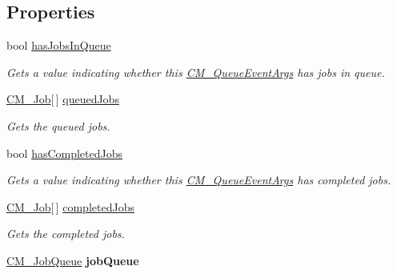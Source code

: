 \subsection*{Properties}
\begin{DoxyCompactItemize}
\item 
bool \hyperlink{class_c_m___queue_event_args_abc07a71f168a798661e040ad0f824591}{has\+Jobs\+In\+Queue}
\begin{DoxyCompactList}\small\item\em Gets a value indicating whether this \hyperlink{class_c_m___queue_event_args}{C\+M\+\_\+\+Queue\+Event\+Args} has jobs in queue. \end{DoxyCompactList}\item 
\hyperlink{class_c_m___job}{C\+M\+\_\+\+Job}\mbox{[}$\,$\mbox{]} \hyperlink{class_c_m___queue_event_args_a9a7016a83b4d77bfede3932565c13704}{queued\+Jobs}
\begin{DoxyCompactList}\small\item\em Gets the queued jobs. \end{DoxyCompactList}\item 
bool \hyperlink{class_c_m___queue_event_args_afa1760a1c067cea569209cf7458d1e5b}{has\+Completed\+Jobs}
\begin{DoxyCompactList}\small\item\em Gets a value indicating whether this \hyperlink{class_c_m___queue_event_args}{C\+M\+\_\+\+Queue\+Event\+Args} has completed jobs. \end{DoxyCompactList}\item 
\hyperlink{class_c_m___job}{C\+M\+\_\+\+Job}\mbox{[}$\,$\mbox{]} \hyperlink{class_c_m___queue_event_args_a89e1c990b52231168f5534204edfa25a}{completed\+Jobs}
\begin{DoxyCompactList}\small\item\em Gets the completed jobs. \end{DoxyCompactList}\item 
\hypertarget{class_c_m___queue_event_args_a4712e29b49def5bf891e70cb05182dbe}{}\hyperlink{class_c_m___job_queue}{C\+M\+\_\+\+Job\+Queue} {\bfseries job\+Queue}\label{class_c_m___queue_event_args_a4712e29b49def5bf891e70cb05182dbe}

\end{DoxyCompactItemize}


